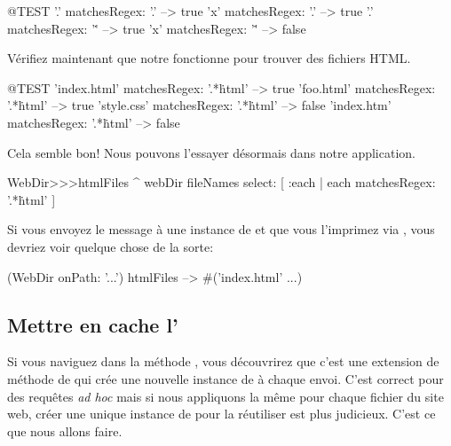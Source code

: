 \documentclass[a4paper,10pt,twoside]{book}
\begin{document}
\begin{code}{@TEST}
'.' matchesRegex: '.'   --> true
'x' matchesRegex: '.'  --> true
'.' matchesRegex: '\.'  --> true
'x' matchesRegex: '\.' --> false
\end{code}

Vérifiez maintenant que notre \expreg fonctionne pour trouver des fichiers
HTML.

\begin{code}{@TEST}
'index.html' matchesRegex: '.*\.html' --> true
'foo.html' matchesRegex: '.*\.html'    --> true
'style.css' matchesRegex: '.*\.html'   --> false
'index.htm' matchesRegex: '.*\.html' --> false
\end{code}

Cela semble bon! Nous pouvons l'essayer désormais dans notre application. 


\begin{code}{}
WebDir>>>htmlFiles
	^ webDir fileNames select: [ :each | each matchesRegex: '.*\.html' ]
\end{code}

Si vous envoyez le message  à une instance de
 et que vous l'imprimez via , vous devriez
voir quelque chose de la sorte:

\begin{code}{}
(WebDir onPath: '...') htmlFiles --> #('index.html' ...)
\end{code}

\subsection{Mettre en cache l'\expreg}

Si vous naviguez dans la méthode , vous
découvrirez que c'est une extension de méthode de 
qui crée une nouvelle instance de  à chaque envoi.
C'est correct pour des requêtes \emph{ad hoc} mais si nous appliquons
la même \expreg pour chaque fichier du site web, créer une unique
instance de  pour la réutiliser est plus judicieux.
C'est ce que nous allons faire.
\end{document}
